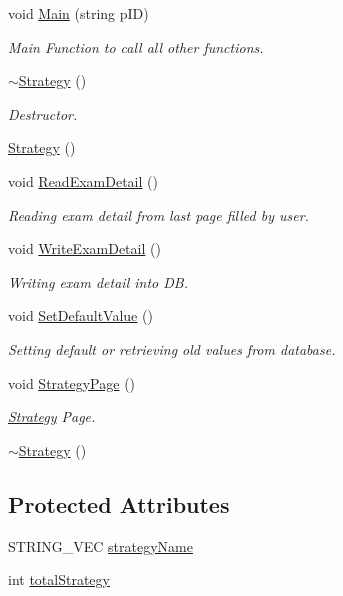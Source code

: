 \begin{DoxyCompactItemize}
\item 
void \hyperlink{classStrategy_a7d4c0323880066ee2815a3b3f20b61ea}{Main} (string p\-I\-D)
\begin{DoxyCompactList}\small\item\em Main Function to call all other functions. \end{DoxyCompactList}\item 
\hyperlink{classStrategy_a37c0bbdd64fd7dfcdd91578784a64775}{$\sim$\-Strategy} ()
\begin{DoxyCompactList}\small\item\em Destructor. \end{DoxyCompactList}\item 
\hyperlink{classStrategy_a2021a15bbc4f0d13f7b92f8933db2235}{Strategy} ()
\item 
void \hyperlink{classStrategy_abb7a716f8403d4ec3d5d127f789ba6ba}{Read\-Exam\-Detail} ()
\begin{DoxyCompactList}\small\item\em Reading exam detail from last page filled by user. \end{DoxyCompactList}\item 
void \hyperlink{classStrategy_a3825da44242fdf8442ffbd9cfd922803}{Write\-Exam\-Detail} ()
\begin{DoxyCompactList}\small\item\em Writing exam detail into D\-B. \end{DoxyCompactList}\item 
void \hyperlink{classStrategy_a5ae1ee77d05ad12afedef648f583328a}{Set\-Default\-Value} ()
\begin{DoxyCompactList}\small\item\em Setting default or retrieving old values from database. \end{DoxyCompactList}\item 
void \hyperlink{classStrategy_ac3f851b75390a71e3a4c6dfd9b15dafb}{Strategy\-Page} ()
\begin{DoxyCompactList}\small\item\em \hyperlink{classStrategy}{Strategy} Page. \end{DoxyCompactList}\item 
\hyperlink{classStrategy_a37c0bbdd64fd7dfcdd91578784a64775}{$\sim$\-Strategy} ()
\end{DoxyCompactItemize}
\subsection*{Protected Attributes}
\begin{DoxyCompactItemize}
\item 
S\-T\-R\-I\-N\-G\-\_\-\-V\-E\-C \hyperlink{classStrategy_ae6c656d6bf12b37ad7ddf523b1eb1123}{strategy\-Name}
\item 
int \hyperlink{classStrategy_ace5cccbe2419bb086f0e0e5dd481b298}{total\-Strategy}
\end{DoxyCompactItemize}
